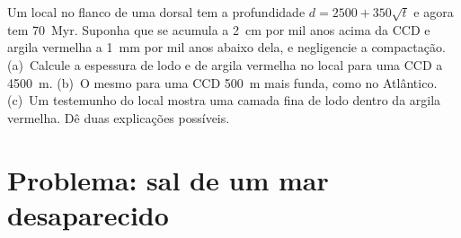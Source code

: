 \begin{exercise}[$\star\star\star$]\label{exo:b1:chemical-biogenic-sediments:12}
Um local no flanco de uma dorsal tem a profundidade $d = 2500 + 350\sqrt t$ e agora tem
\qty{70}{Myr}. Suponha que  se acumula a \qty{2}{cm} por mil anos acima da CCD
e argila vermelha a \qty{1}{mm} por mil anos abaixo dela, e negligencie a compactação.
(a)~Calcule a espessura de lodo e de argila vermelha no local para uma CCD a \qty{4500}{m}.
(b)~O mesmo para uma CCD \qty{500}{m} mais funda, como no Atlântico. (c)~Um testemunho do
local mostra uma camada fina de lodo dentro da argila vermelha. Dê duas explicações possíveis.
\end{exercise}

\section{Problema: sal de um mar desaparecido}

